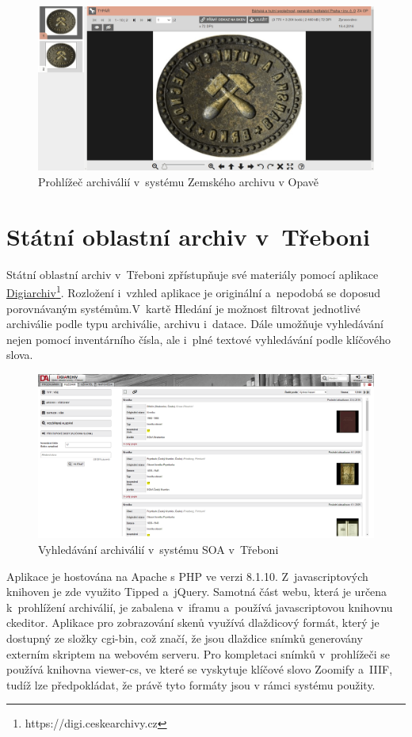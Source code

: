 \begin{figure}[htbp]
\centering
    \includegraphics[scale=.2]{obrazky-figures/archives/zaOpava/prohlizec.png}
    \caption{Prohlížeč archiválií v~systému Zemského archivu v Opavě}
\end{figure}

\section{Státní oblastní archiv v~Třeboni}
Státní oblastní archiv v~Třeboni zpřístupňuje své materiály pomocí aplikace \href{https://digi.ceskearchivy.cz}{Digiarchiv}\footnote{https://digi.ceskearchivy.cz}. Rozložení i~vzhled aplikace je originální a~nepodobá se doposud porovnávaným systémům.V~kartě Hledání je možnost filtrovat jednotlivé archiválie podle typu archiválie, archivu i~datace. Dále umožňuje vyhledávání nejen pomocí inventárního čísla, ale i~plné textové vyhledávání podle klíčového slova.

\begin{figure}[htbp]
\centering
    \includegraphics[scale=.2]{obrazky-figures/archives/soaTrebon/vyhledani.png}
    \caption{Vyhledávání archiválií v~systému SOA v~Třeboni}
\end{figure}
\noindent
Aplikace je hostována na Apache s PHP ve verzi 8.1.10. Z~javascriptových knihoven je zde využito Tipped a~jQuery. Samotná část webu, která je určena k~prohlížení archiválií, je zabalena v~iframu a~používá javascriptovou knihovnu ckeditor. Aplikace pro zobrazování skenů využívá dlaždicový formát, který je dostupný ze složky cgi-bin, což značí, že jsou dlaždice snímků generovány externím skriptem na webovém serveru. Pro kompletaci snímků v~prohlížeči se používá knihovna viewer-cs, ve které se vyskytuje klíčové slovo Zoomify a~IIIF, tudíž lze předpokládat, že právě tyto formáty jsou v rámci systému použity.


